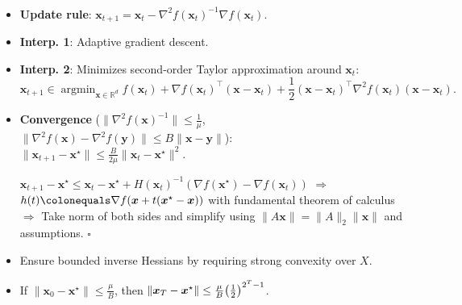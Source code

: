 \documentclass[8pt,a4paper]{extarticle}
\renewcommand{\proof}[1]{\begin{tcolorbox}#1 \hfill $\square$\end{tcolorbox}}
\DeclareMathOperator*{\argmin}{argmin}
\newcommand{\lft}{\mathopen{}\mathclose\bgroup\left}
\newcommand{\rgt}{\aftergroup\egroup\right}
\newcommand{\R}{\mathbb{R}}
\renewcommand{\vec}[1]{\bm{#1}}
\newcommand{\mat}[1]{#1}
\newenvironment{topic}[1]
{\textbf{\sffamily \colorbox{black}{\rlap{\textbf{\textcolor{white}{#1}}}\hspace{\linewidth}\hspace{-2\fboxsep}}} \\ \vspace{0.2cm}}
{}
\begin{document}
\begin{multicols*}{2}
    \begin{topic}{Newton's method}
        \begin{itemize}
            \item \textbf{Update rule}: $\vec{x}_{t+1} = \vec{x}_t - \nabla^2 f(\vec{x}_t)^{-1} \nabla f(\vec{x}_t)$.
            \item \textbf{Interp. 1}: Adaptive gradient descent.
            \item \textbf{Interp. 2}: Minimizes second-order Taylor approximation around $\vec{x}_t$: \[
                      \vec{x}_{t+1} \in \argmin_{\vec{x} \in \R^d} f(\vec{x}_t) + \nabla f(\vec{x}_t)^\top (\vec{x} - \vec{x}_t) + \frac{1}{2} (\vec{x} - \vec{x}_t)^\top \nabla^2 f(\vec{x}_t) (\vec{x} - \vec{x}_t).
                  \]
            \item \textbf{Convergence} ($\| \nabla^2 f(\vec{x})^{-1} \| \leq \frac{1}{\mu}$, $\| \nabla^2 f(\vec{x}) - \nabla^2 f(\vec{y}) \| \leq B \| \vec{x} - \vec{y} \|$): \\
                  $\| \vec{x}_{t+1} - \vec{x}^\star \| \leq \frac{B}{2 \mu} \| \vec{x}_t - \vec{x}^\star \|^2$.
                  \proof{$\vec{x}_{t+1} - \vec{x}^\star \leq \vec{x}_t - \vec{x}^\star +
                          H(\vec{x}_t)^{-1} (\nabla f(\vec{x}^\star) - \nabla f(\vec{x}_t))$ $\Rightarrow$
                      $h(t) \colonequals \nabla f(\vec{x} + t(\vec{x}^\star - \vec{x}))$ with fundamental theorem
                      of calculus $\Rightarrow$ Take norm of both sides and simplify using $\| \mat{A}
                          \vec{x} \| = \| \mat{A} \|_2 \| \vec{x} \|$ and assumptions.}
            \item Ensure bounded inverse Hessians by requiring strong convexity over $X$.
            \item If $\| \vec{x}_0 - \vec{x}^\star \| \leq \frac{\mu}{B}$, then $\| \vec{x}_T - \vec{x}^\star \| \leq
                      \frac{\mu}{B} \lft( \frac{1}{2} \rgt)^{2^T - 1}$.

        \end{itemize}
    \end{topic}


\end{multicols*}
\end{document}
